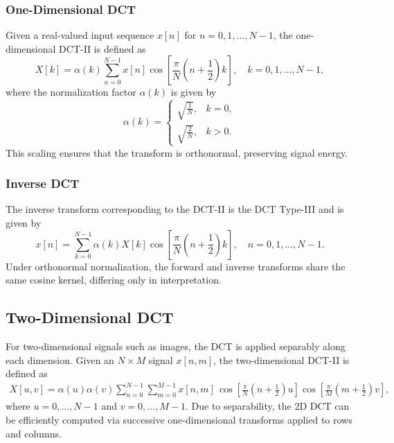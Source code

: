 \documentclass{article}
\begin{document}
\subsubsection{One-Dimensional DCT}

Given a real-valued input sequence $x[n]$ for $n = 0,1,\dots,N-1$, the one-dimensional DCT-II is defined as
\begin{equation}
X[k] = \alpha(k) \sum_{n=0}^{N-1} x[n]
\cos\left[ \frac{\pi}{N} \left(n + \frac{1}{2}\right) k \right],
\quad k = 0,1,\dots,N-1,
\end{equation}
where the normalization factor $\alpha(k)$ is given by
\begin{equation}
\alpha(k) =
\begin{cases}
\sqrt{\frac{1}{N}}, & k = 0, \\
\sqrt{\frac{2}{N}}, & k > 0.
\end{cases}
\end{equation}
This scaling ensures that the transform is orthonormal, preserving signal energy.

\subsubsection{Inverse DCT}

The inverse transform corresponding to the DCT-II is the DCT Type-III and is given by
\begin{equation}
x[n] = \sum_{k=0}^{N-1} \alpha(k) X[k]
\cos\left[ \frac{\pi}{N} \left(n + \frac{1}{2}\right) k \right],
\quad n = 0,1,\dots,N-1.
\end{equation}
Under orthonormal normalization, the forward and inverse transforms share the same cosine kernel, differing only in interpretation.

\subsection{Two-Dimensional DCT}

For two-dimensional signals such as images, the DCT is applied separably along each dimension. Given an $N \times M$ signal $x[n,m]$, the two-dimensional DCT-II is defined as
\begin{equation}
\begin{aligned}
X[u,v] = \alpha(u)\alpha(v)
\sum_{n=0}^{N-1}
\sum_{m=0}^{M-1}
x[n,m] \,
\cos\left[\frac{\pi}{N}\left(n + \frac{1}{2}\right)u\right]
\cos\left[\frac{\pi}{M}\left(m + \frac{1}{2}\right)v\right],
\end{aligned}
\end{equation}
where $u = 0,\dots,N-1$ and $v = 0,\dots,M-1$. Due to separability, the 2D DCT can be efficiently computed via successive one-dimensional transforms applied to rows and columns.
\end{document}
